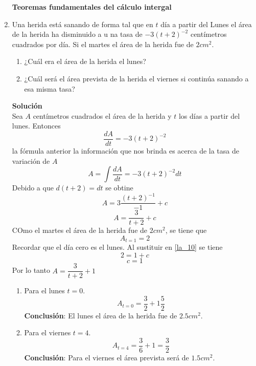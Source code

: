 \documentclass[10pt,twoside]{SelfArx} %
\begin{document}
\begin{enumerate}
\textbf{Teoremas fundamentales del cálculo intergal}\\
\item Una herida está sanando de forma tal que en $ t $ día a partir del Lunes el área de la herida ha disminuido a u na tasa de $ -3(t+2)^{-2} $ centímetros cuadrados por día. Si el martes el área de la herida fue de $ 2 cm^{2} $.
\begin{enumerate}
	\item ¿Cuál era el área de la herida el lunes?
	\item ¿Cuál será el área prevista de la herida el viernes si continúa sanando a esa misma tasa?
\end{enumerate}
\textbf{Solución}\\
Sea $ A  $ centímetros cuadrados el área de la herida y $ t $ los días a partir del lunes. Entonces
\begin{equation}
\dfrac{dA}{dt}=-3(t+2)^{-2}
\end{equation}
la fórmula anterior la información que nos brinda es acerca de la tasa de variación de $ A $
\begin{equation}
A=\int\dfrac{dA}{dt}=-3(t+2)^{-2}dt
\end{equation}
Debido a que $ d(t+2)=dt $ se obtine
\begin{equation}
A=3\dfrac{(t+2)^{-1}}{-1}+c
\end{equation}
\begin{equation}
A=\dfrac{3}{t+2}+c  \label{la_10}
\end{equation}
COmo el martes el área de la herida fue de $ 2cm^{2} $, se tiene que 
\[ A_{t=1}=2 \]
Recordar que el d\'ia cero es el lunes. Al sustituir en \ref{la_10} se tiene
\[ 2=1+c \]
\[ c=1 \]
Por lo tanto $ A=\dfrac{3}{t+2}+1 $
\begin{enumerate}
\item Para el lunes $ t=0.  $\\
\begin{equation}
A_{t=0}=\dfrac{3}{2}+1\dfrac{5}{2}
\end{equation}
\textbf{Conclusión}: El lunes el área de la herida fue de $ 2.5 cm^{2} $.
\item Para el viernes $ t=4 $.
\begin{equation}
A_{t=4}=\dfrac{3}{6}+1=\dfrac{3}{2}
\end{equation}
\textbf{Conclusión}: Para el viernes el área prevista será de $ 1.5 cm^{2} $.
\end{enumerate}




\end{enumerate}
\end{document}
